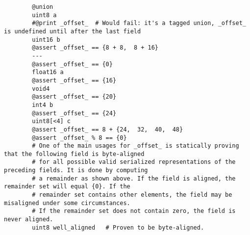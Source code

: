 \begin{remark}
    \begin{verbatim}
        @union
        uint8 a
        #@print _offset_  # Would fail: it's a tagged union, _offset_ is undefined until after the last field
        uint16 b
        @assert _offset_ == {8 + 8,  8 + 16}
        ---
        @assert _offset_ == {0}
        float16 a
        @assert _offset_ == {16}
        void4
        @assert _offset_ == {20}
        int4 b
        @assert _offset_ == {24}
        uint8[<4] c
        @assert _offset_ == 8 + {24,  32,  40,  48}
        @assert _offset_ % 8 == {0}
        # One of the main usages for _offset_ is statically proving that the following field is byte-aligned
        # for all possible valid serialized representations of the preceding fields. It is done by computing
        # a remainder as shown above. If the field is aligned, the remainder set will equal {0}. If the
        # remainder set contains other elements, the field may be misaligned under some circumstances.
        # If the remainder set does not contain zero, the field is never aligned.
        uint8 well_aligned   # Proven to be byte-aligned.
    \end{verbatim}
\end{remark}
